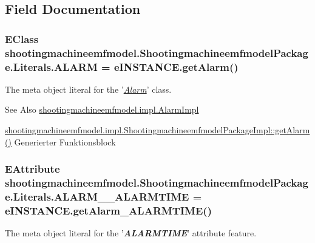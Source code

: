 \subsection{Field Documentation}
\hypertarget{interfaceshootingmachineemfmodel_1_1_shootingmachineemfmodel_package_1_1_literals_a563965a1017bffb037517fdc4bd5a6d5}{
\subsubsection[{A\-L\-A\-R\-M}]{\setlength{\rightskip}{0pt plus 5cm}E\-Class shootingmachineemfmodel.\-Shootingmachineemfmodel\-Package.\-Literals.\-A\-L\-A\-R\-M = e\-I\-N\-S\-T\-A\-N\-C\-E.\-get\-Alarm()}}\label{interfaceshootingmachineemfmodel_1_1_shootingmachineemfmodel_package_1_1_literals_a563965a1017bffb037517fdc4bd5a6d5}
The meta object literal for the '\hyperlink{classshootingmachineemfmodel_1_1impl_1_1_alarm_impl}{{\itshape Alarm}}' class.

\begin{DoxySeeAlso}{See Also}
\hyperlink{classshootingmachineemfmodel_1_1impl_1_1_alarm_impl}{shootingmachineemfmodel.\-impl.\-Alarm\-Impl} 

\hyperlink{classshootingmachineemfmodel_1_1impl_1_1_shootingmachineemfmodel_package_impl_aae7572a42a9d2658df63f0aea15ccf62}{shootingmachineemfmodel.\-impl.\-Shootingmachineemfmodel\-Package\-Impl\-::get\-Alarm()} Generierter Funktionsblock 
\end{DoxySeeAlso}
\hypertarget{interfaceshootingmachineemfmodel_1_1_shootingmachineemfmodel_package_1_1_literals_a17abebf837e070e79742d36847ad9d59}{
\subsubsection[{A\-L\-A\-R\-M\-\_\-\-\_\-\-A\-L\-A\-R\-M\-T\-I\-M\-E}]{\setlength{\rightskip}{0pt plus 5cm}E\-Attribute shootingmachineemfmodel.\-Shootingmachineemfmodel\-Package.\-Literals.\-A\-L\-A\-R\-M\-\_\-\-\_\-\-A\-L\-A\-R\-M\-T\-I\-M\-E = e\-I\-N\-S\-T\-A\-N\-C\-E.\-get\-Alarm\-\_\-\-A\-L\-A\-R\-M\-T\-I\-M\-E()}}\label{interfaceshootingmachineemfmodel_1_1_shootingmachineemfmodel_package_1_1_literals_a17abebf837e070e79742d36847ad9d59}
The meta object literal for the '{\itshape {\bfseries A\-L\-A\-R\-M\-T\-I\-M\-E}}' attribute feature.

